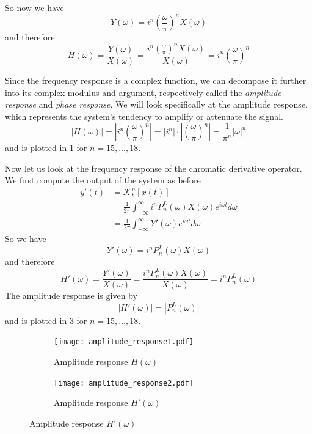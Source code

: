 \documentclass[11pt]{article} %
\theoremstyle{plain}
\theoremstyle{definition}
\theoremstyle{remark}
\begin{document}
So now we have 
\begin{equation*}
  Y(\omega) = i^n \left(\frac{\omega}{\pi}\right)^n X(\omega)
\end{equation*}
and therefore
\begin{equation*}
  H(\omega) = \frac{Y(\omega)}{X(\omega)} = \frac{i^n \left(\frac{\omega}{\pi}\right)^n X(\omega)}{X(\omega)} = i^n \left(\frac{\omega}{\pi}\right)^n
\end{equation*}

Since the frequency response is a complex function, we can decompose it further 
into its complex modulus and argument, respectively called the \emph{amplitude response}
and \emph{phase response}. We will look specifically at the amplitude response, which 
represents the system's tendency to amplify or attenuate the signal.
\begin{equation*}
  |H(\omega)| = \left|i^n \left(\frac{\omega}{\pi}\right)^n\right| 
              = |i^n| \cdot \left|\left(\frac{\omega}{\pi}\right)^n\right| 
              = \frac{1}{\pi^n} |\omega|^n
\end{equation*}
and is plotted in \cref{fig:amp_response1} for $n=15, \dotsc, 18$.

Now let us look at the frequency response of the chromatic derivative operator. We first compute 
the output of the system as before
\begin{align*}
  y'(t) &= \mathcal{K}_t^n[x(t)] \\
        &= \frac{1}{2 \pi} \int_{-\infty}^{\infty} i^n P_n^L(\omega) X(\omega) e^{i\omega t} d\omega \\
        &= \frac{1}{2 \pi} \int_{-\infty}^{\infty} Y'(\omega) e^{i\omega t} d\omega
\end{align*}
So we have
\begin{equation*}
  Y'(\omega) = i^n P_n^L(\omega) X(\omega)
\end{equation*}
and therefore
\begin{equation*}
  H'(\omega) = \frac{Y'(\omega)}{X(\omega)} = \frac{i^n P_n^L(\omega) X(\omega)}{X(\omega)} = i^n P_n^L(\omega)
\end{equation*}
The amplitude response is given by
\begin{equation*}
  |H'(\omega)| = |P_n^L(\omega)|
\end{equation*}
and is plotted in \cref{fig:amp_response2} for $n=15, \dotsc, 18$.

\begin{figure}[H]
  \centering
  \caption{Amplitude responses of the differential (left) and chromatic derivative (right) operators for $n=15, \dotsc, 18$.}
  \begin{subfigure}[b]{0.49\textwidth}
    \texttt{[image: amplitude\_response1.pdf]}
    \caption{Amplitude response $H(\omega)$}
    \label{fig:amp_response1}
  \end{subfigure}
  \hfill
  \begin{subfigure}[b]{0.49\textwidth}
    \texttt{[image: amplitude\_response2.pdf]}
    \caption{Amplitude response $H'(\omega)$}
    \label{fig:amp_response2}
  \end{subfigure}
\end{figure}
\end{document}
